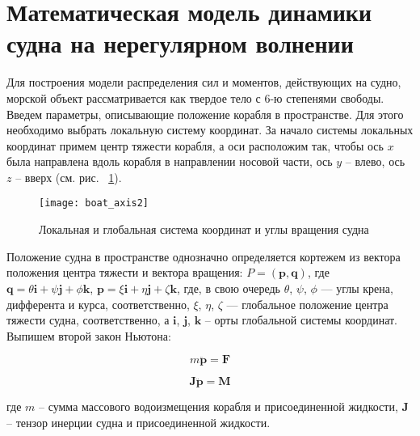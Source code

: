 \section{Математическая модель динамики судна на нерегулярном волнении}
\label{math_ship}

Для построения модели распределения сил и моментов, действующих на судно, морской объект рассматривается как твердое тело с 6-ю степенями свободы. Введем параметры, описывающие положение корабля в пространстве. Для этого необходимо выбрать локальную систему координат. За начало системы локальных координат примем центр тяжести корабля, а оси расположим так, чтобы ось $x$ была направлена вдоль корабля в направлении носовой части, ось $y$ – влево, ось $z$ – вверх (см. рис. ~\ref{boat_axis}).

\begin{figure}[ht]
\begin{center}
\texttt{[image: boat\_axis2]}
\end{center}
\caption{Локальная и глобальная система координат и углы вращения судна}
\label{boat_axis}
\end{figure}

Положение судна в пространстве однозначно определяется кортежем из вектора положения центра тяжести и вектора вращения: 
$P=(\mathbf{p},\mathbf{q})$, 
где  
$\mathbf{q}=\theta \mathbf{i}+\psi \mathbf{j}+\phi \mathbf{k}$, 
$\mathbf{p}=\xi \mathbf{i}+\eta \mathbf{j}+\zeta \mathbf{k}$, 
где, в свою очередь $\theta$, $\psi$, $\phi$ --- углы крена, дифферента и курса, соответственно, 
 $\xi$, $\eta$, $\zeta$ --- глобальное положение центра тяжести судна, соответственно, 
а $\mathbf{i}$, $\mathbf{j}$, $\mathbf{k}$ – орты глобальной системы координат. Выпишем второй закон Ньютона:

\begin{equation}
	m \ddot{\mathbf{p}} = \mathbf{F}
	\label{ma=F}
\end{equation}

\begin{equation}
	\mathbf{J}  \ddot{\mathbf{p}} = \mathbf{M}
	\label{jq=M}
\end{equation}

где $m$ – сумма массового водоизмещения корабля и присоединенной жидкости, $\mathbf{J}$ – тензор инерции судна и присоединенной жидкости. 

